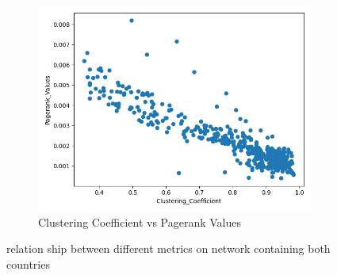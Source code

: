 \begin{figure}[H]
\begin{subfigure}[b]{0.3\textwidth}
     \end{subfigure}
     \hfill
     \begin{subfigure}[b]{0.3\textwidth}
         \centering
         \includegraphics[width=\textwidth]{images/comparison/ALL/relationship_Clustering_Coefficient_vs_Pagerank_Values_ALL.png}
         \caption{Clustering Coefficient vs Pagerank Values}
     \end{subfigure}
        \caption{relation ship between different metrics on network containing both countries}
        \label{fig:ALL1}
\end{figure}



